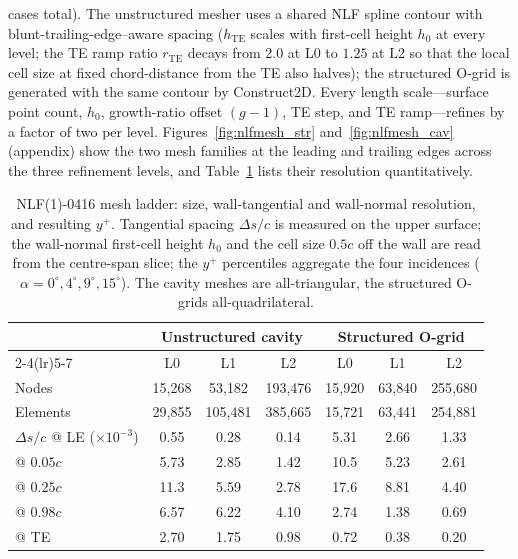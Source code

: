 \documentclass[journal]{new-aiaa}
\begin{document}
cases total). The unstructured mesher uses a shared NLF spline contour with
blunt-trailing-edge--aware spacing ($h_\mathrm{TE}$ scales with first-cell
height $h_0$ at every level; the TE ramp ratio $r_\mathrm{TE}$ decays from
$2.0$ at L0 to $1.25$ at L2 so that the local cell size at fixed chord-distance
from the TE also halves); the structured O-grid is generated with the same
contour by Construct2D. Every length scale---surface point count, $h_0$,
growth-ratio offset $(g-1)$, TE step, and TE ramp---refines by a factor of two
per level.
Figures~\ref{fig:nlfmesh_str} and~\ref{fig:nlfmesh_cav} (appendix) show the
two mesh families at the leading and trailing edges across the three
refinement levels, and Table~\ref{tab:nlfmesh} lists their resolution
quantitatively.

\begin{table}[tp]
  \centering
  \small
  \caption{NLF(1)-0416 mesh ladder: size, wall-tangential and wall-normal
  resolution, and resulting $y^+$. Tangential spacing $\Delta s/c$ is measured on
  the upper surface; the wall-normal first-cell height $h_0$ and the cell size
  $0.5c$ off the wall are read from the centre-span slice; the $y^+$ percentiles
  aggregate the four incidences ($\alpha\!=\!0^\circ,4^\circ,9^\circ,15^\circ$).
  The cavity meshes are all-triangular, the structured O-grids all-quadrilateral.}
  \label{tab:nlfmesh}
  \begin{tabular}{l cccccc}
    \toprule
    & \multicolumn{3}{c}{Unstructured cavity} & \multicolumn{3}{c}{Structured O-grid}\\
    \cmidrule(lr){2-4}\cmidrule(lr){5-7}
    & L0 & L1 & L2 & L0 & L1 & L2 \\
    \midrule
    Nodes    & 15{,}268 & 53{,}182 & 193{,}476 & 15{,}920 & 63{,}840 & 255{,}680 \\
    Elements & 29{,}855 & 105{,}481 & 385{,}665 & 15{,}721 & 63{,}441 & 254{,}881 \\
    \addlinespace
    $\Delta s/c$ @ LE ($\times10^{-3}$)      & 0.55 & 0.28 & 0.14 & 5.31 & 2.66 & 1.33 \\
    \quad @ $0.05c$                          & 5.73 & 2.85 & 1.42 & 10.5 & 5.23 & 2.61 \\
    \quad @ $0.25c$                          & 11.3 & 5.59 & 2.78 & 17.6 & 8.81 & 4.40 \\
    \quad @ $0.98c$                          & 6.57 & 6.22 & 4.10 & 2.74 & 1.38 & 0.69 \\
    \quad @ TE                               & 2.70 & 1.75 & 0.98 & 0.72 & 0.38 & 0.20 \\

\end{tabular}
\end{table}
\end{document}
